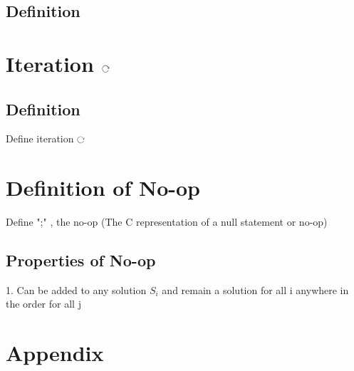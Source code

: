 \documentclass[11pt]{article}
\def \loop {\ensuremath{\rotatebox[origin=c]{-90}{$\circlearrowright$}}}
\begin{document}
\subsection{Definition}


\section{Iteration \loop}
\subsection{Definition}
Define iteration \loop

\section{Definition of No-op}
Define ";" , the no-op (The C representation of a null statement or no-op)
\subsection{Properties of No-op}
1. Can be added to any solution $S_i$ and remain a solution for all i anywhere in the order for all j











\section{Appendix}
\end{document}
